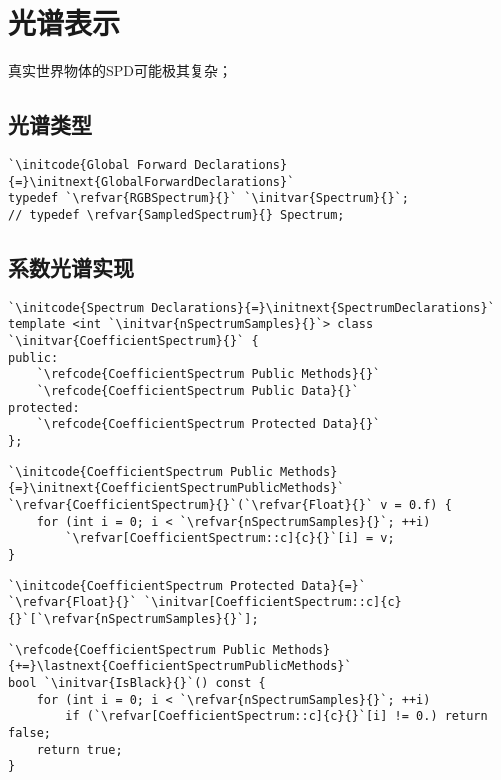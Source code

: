 \section{光谱表示}\label{sec:光谱表示}

真实世界物体的SPD可能极其复杂；

\subsection{光谱类型}\label{sub:光谱类型}
\begin{lstlisting}
`\initcode{Global Forward Declarations}{=}\initnext{GlobalForwardDeclarations}`
typedef `\refvar{RGBSpectrum}{}` `\initvar{Spectrum}{}`;
// typedef \refvar{SampledSpectrum}{} Spectrum;
\end{lstlisting}

\subsection{系数光谱实现}\label{sub:系数光谱实现}
\begin{lstlisting}
`\initcode{Spectrum Declarations}{=}\initnext{SpectrumDeclarations}`
template <int `\initvar{nSpectrumSamples}{}`> class `\initvar{CoefficientSpectrum}{}` {
public:
    `\refcode{CoefficientSpectrum Public Methods}{}`
    `\refcode{CoefficientSpectrum Public Data}{}`
protected:
    `\refcode{CoefficientSpectrum Protected Data}{}`
};
\end{lstlisting}

\begin{lstlisting}
`\initcode{CoefficientSpectrum Public Methods}{=}\initnext{CoefficientSpectrumPublicMethods}`
`\refvar{CoefficientSpectrum}{}`(`\refvar{Float}{}` v = 0.f) {
    for (int i = 0; i < `\refvar{nSpectrumSamples}{}`; ++i)
        `\refvar[CoefficientSpectrum::c]{c}{}`[i] = v;
}
\end{lstlisting}

\begin{lstlisting}
`\initcode{CoefficientSpectrum Protected Data}{=}`
`\refvar{Float}{}` `\initvar[CoefficientSpectrum::c]{c}{}`[`\refvar{nSpectrumSamples}{}`];
\end{lstlisting}

\begin{lstlisting}
`\refcode{CoefficientSpectrum Public Methods}{+=}\lastnext{CoefficientSpectrumPublicMethods}`
bool `\initvar{IsBlack}{}`() const {
    for (int i = 0; i < `\refvar{nSpectrumSamples}{}`; ++i)
        if (`\refvar[CoefficientSpectrum::c]{c}{}`[i] != 0.) return false;
    return true;
}
\end{lstlisting}